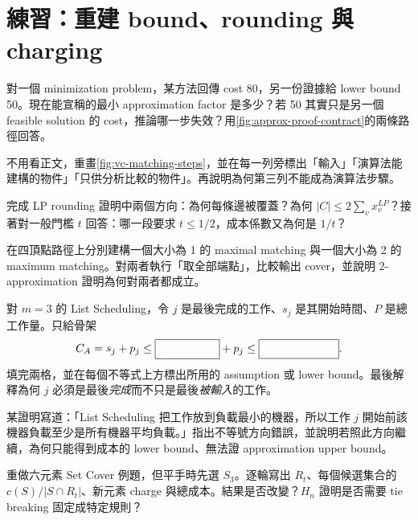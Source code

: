 \documentclass[11pt,a4paper,oneside,openany]{book}
\begin{document}
\section{練習：重建 bound、rounding 與 charging}
\begin{exercise}
對一個 minimization problem，某方法回傳 cost 80，另一份證據給 lower bound 50。現在能宣稱的最小 approximation factor 是多少？若 50 其實只是另一個 feasible solution 的 cost，推論哪一步失效？用\cref{fig:approx-proof-contract}的兩條路徑回答。
\end{exercise}
\begin{exercise}
不用看正文，重畫\cref{fig:vc-matching-steps}，並在每一列旁標出「輸入」「演算法能建構的物件」「只供分析比較的物件」。再說明為何第三列不能成為演算法步驟。
\end{exercise}
\begin{exercise}
\label{ex:vc-rounding}
完成 LP rounding 證明中兩個方向：為何每條邊被覆蓋？為何 $|C|\le2\sum_vx_v^{LP}$？接著對一般門檻 $t$ 回答：哪一段要求 $t\le1/2$，成本係數又為何是 $1/t$？
\end{exercise}
\begin{exercise}
在四頂點路徑上分別建構一個大小為 1 的 maximal matching 與一個大小為 2 的 maximum matching。對兩者執行「取全部端點」，比較輸出 cover，並說明 2-approximation 證明為何對兩者都成立。
\end{exercise}
\begin{exercise}
對 $m=3$ 的 List Scheduling，令 $j$ 是最後完成的工作、$s_j$ 是其開始時間、$P$ 是總工作量。只給骨架
\[
 C_A=s_j+p_j\le \boxed{\phantom{(P-p_j)/m}}+p_j
 \le \boxed{\phantom{(2-1/m)\OPT}}.
\]
填完兩格，並在每個不等式上方標出所用的 assumption 或 lower bound。最後解釋為何 $j$ 必須是最後\emph{完成}而不只是最後\emph{被輸入}的工作。
\end{exercise}
\begin{exercise}
某證明寫道：「List Scheduling 把工作放到負載最小的機器，所以工作 $j$ 開始前該機器負載至少是所有機器平均負載。」指出不等號方向錯誤，並說明若照此方向繼續，為何只能得到成本的 lower bound、無法證 approximation upper bound。
\end{exercise}
\begin{exercise}
重做六元素 Set Cover 例題，但平手時先選 $S_3$。逐輪寫出 $R_t$、每個候選集合的 $c(S)/|S\cap R_t|$、新元素 charge 與總成本。結果是否改變？$H_n$ 證明是否需要 tie breaking 固定成特定規則？
\end{exercise}
\end{document}
